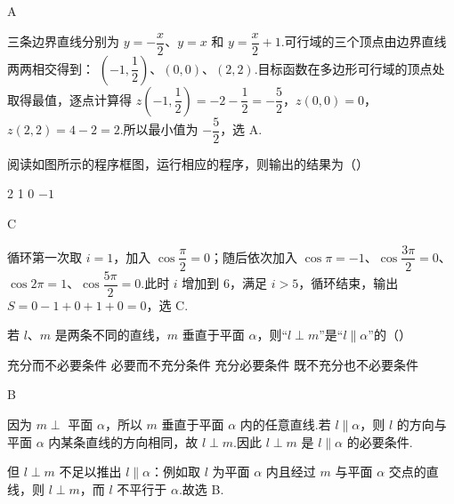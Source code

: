 \begin{answer}
A
\end{answer}

\begin{solution}
三条边界直线分别为 \(y=-\dfrac{x}{2}\)、\(y=x\) 和 \(y=\dfrac{x}{2}+1\).可行域的三个顶点由边界直线两两相交得到：
\((-1,\dfrac12)\)、\((0,0)\)、\((2,2)\).目标函数在多边形可行域的顶点处取得最值，逐点计算得
\(z(-1,\dfrac12)=-2-\dfrac12=-\dfrac52\)，\(z(0,0)=0\)，\(z(2,2)=4-2=2\).所以最小值为 \(-\dfrac52\)，选 A.
\end{solution}

\begin{problem}
阅读如图所示的程序框图，运行相应的程序，则输出的结果为（\quad）


\choices
    {2}
    {1}
    {0}
    {\(-1\)}
\end{problem}

\begin{answer}
C
\end{answer}

\begin{solution}
循环第一次取 \(i=1\)，加入 \(\cos\dfrac{\pi}{2}=0\)；随后依次加入
\(\cos\pi=-1\)、\(\cos\dfrac{3\pi}{2}=0\)、\(\cos2\pi=1\)、\(\cos\dfrac{5\pi}{2}=0\).此时 \(i\) 增加到 \(6\)，满足 \(i>5\)，循环结束，输出
\(S=0-1+0+1+0=0\)，选 C.
\end{solution}

\begin{problem}
若 \(l\)、\(m\) 是两条不同的直线，\(m\) 垂直于平面 \(\alpha\)，则“\(l \perp m\)”是“\(l \parallel \alpha\)”的（\quad）

\choices
    {充分而不必要条件}
    {必要而不充分条件}
    {充分必要条件}
    {既不充分也不必要条件}
\end{problem}

\begin{answer}
B
\end{answer}

\begin{solution}
因为 \(m\perp\) 平面 \(\alpha\)，所以 \(m\) 垂直于平面 \(\alpha\) 内的任意直线.若 \(l\parallel\alpha\)，则 \(l\) 的方向与平面 \(\alpha\) 内某条直线的方向相同，故 \(l\perp m\).因此 \(l\perp m\) 是 \(l\parallel\alpha\) 的必要条件.

但 \(l\perp m\) 不足以推出 \(l\parallel\alpha\)：例如取 \(l\) 为平面 \(\alpha\) 内且经过 \(m\) 与平面 \(\alpha\) 交点的直线，则 \(l\perp m\)，而 \(l\) 不平行于 \(\alpha\).故选 B.
\end{solution}

